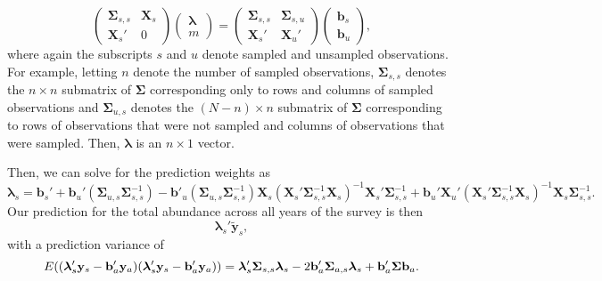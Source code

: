 \documentclass[]{interact}
\theoremstyle{plain}%
\theoremstyle{definition}
\theoremstyle{remark}
\begin{document}
\begin{equation}
\begin{pmatrix}
\bm{\Sigma}_{s, s} & \mathbf{X}_s \\
\mathbf{X}_s' & 0
\end{pmatrix} 
\begin{pmatrix}
\bm{\lambda} \\
m
\end{pmatrix} = 
\begin{pmatrix}
\bm{\Sigma}_{s, s} & \bm{\Sigma}_{s, u} \\
\mathbf{X}_{s}' & \mathbf{X}_{u}'
\end{pmatrix} 
\begin{pmatrix}
\mathbf{b}_{s} \\
\mathbf{b}_{u}
\end{pmatrix},
\end{equation} \noindent where again the subscripts \(s\) and \(u\)
denote sampled and unsampled observations. For example, letting \(n\)
denote the number of sampled observations, \(\bm{\Sigma}_{s, s}\)
denotes the \(n \times n\) submatrix of \(\bm{\Sigma}\) corresponding
only to rows and columns of sampled observations and
\(\bm{\Sigma}_{u, s}\) denotes the \((N - n) \times n\) submatrix of
\(\bm{\Sigma}\) corresponding to rows of observations that were not
sampled and columns of observations that were sampled. Then,
\(\bm{\lambda}\) is an \(n \times 1\) vector.

Then, we can solve for the prediction weights as \mbox{}
\begin{equation}
\bm{\lambda}_s = \mathbf{b}_{s}' + \mathbf{b}_{u}' (\bm{\Sigma}_{u, s}\bm{\Sigma}_{s, s}^{-1}) - \mathbf{b}'_{u}(\bm{\Sigma}_{u, s} \bm{\Sigma}_{s, s}^{-1})\mathbf{X}_s(\mathbf{X}_s'\bm{\Sigma}_{s, s}^{-1}\mathbf{X}_s)^{-1}\mathbf{X}_s'\bm{\Sigma}_{s, s}^{-1} + \mathbf{b}_{u}' \mathbf{X}_{u}'(\mathbf{X}_s'\bm{\Sigma}_{s, s}^{-1}\mathbf{X}_s)^{-1}\mathbf{X}_s \bm{\Sigma}_{s, s}^{-1}.
\end{equation} \noindent Our prediction for the total abundance across
all years of the survey is then \mbox{} \begin{equation}
\bm{\lambda}_s' \mathbf{\tilde{y}}_s,
\end{equation} \noindent with a prediction variance of \mbox{}
\begin{equation}
E((\bm{\lambda}_s'\mathbf{y}_s - \mathbf{b}_a'\mathbf{y}_a)(\bm{\lambda}_s'\mathbf{y}_s - \mathbf{b}_a'\mathbf{y}_a)) = \\
\bm{\lambda}_s'\bm{\Sigma}_{s, s}\bm{\lambda}_s - 2 \mathbf{b}_a' \bm{\Sigma}_{a ,s} \bm{\lambda}_s + \mathbf{b}_a' \bm{\Sigma}\mathbf{b}_a.
\end{equation}
\end{document}
